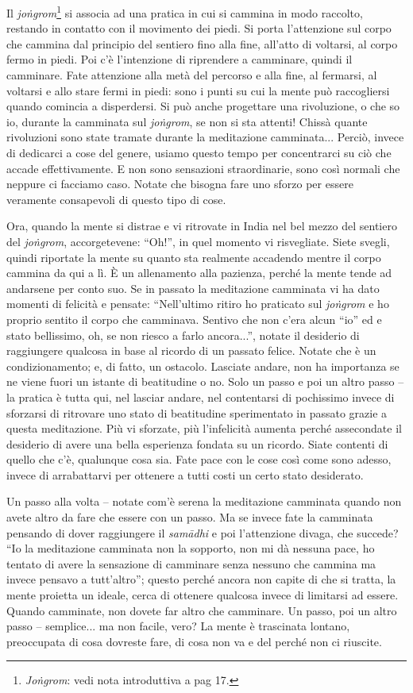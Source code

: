 
Il \textit{joṅgrom}\footnote{\textit{Joṅgrom}: vedi nota introduttiva a pag 17.} si associa ad una pratica in cui si cammina in
modo raccolto, restando in contatto con il movimento dei piedi. Si porta
l'attenzione sul corpo che cammina dal principio del sentiero fino alla
fine, all'atto di voltarsi, al corpo fermo in piedi. Poi c'è
l'intenzione di riprendere a camminare, quindi il camminare. Fate
attenzione alla metà del percorso e alla fine, al fermarsi, al voltarsi
e allo stare fermi in piedi: sono i punti su cui la mente può
raccogliersi quando comincia a disperdersi. Si può anche progettare una
rivoluzione, o che so io, durante la camminata sul \textit{joṅgrom}, se non si
sta attenti! Chissà quante rivoluzioni sono state tramate durante la
meditazione camminata... Perciò, invece di dedicarci a cose del genere,
usiamo questo tempo per concentrarci su ciò che accade effettivamente. E
non sono sensazioni straordinarie, sono così normali che neppure ci
facciamo caso. Notate che bisogna fare uno sforzo per essere veramente
consapevoli di questo tipo di cose.

Ora, quando la mente si distrae e vi ritrovate in India nel bel mezzo
del sentiero del \textit{joṅgrom}, accorgetevene: ``Oh!'', in quel momento vi
risvegliate. Siete svegli, quindi riportate la mente su quanto sta
realmente accadendo mentre il corpo cammina da qui a lì. È un
allenamento alla pazienza, perché la mente tende ad andarsene per conto
suo. Se in passato la meditazione camminata vi ha dato momenti di
felicità e pensate: ``Nell'ultimo ritiro ho praticato sul \textit{joṅgrom} e ho
proprio sentito il corpo che camminava. Sentivo che non c'era alcun ``io''
ed e stato bellissimo, oh, se non riesco a farlo ancora...'', notate il
desiderio di raggiungere qualcosa in base al ricordo di un passato
felice. Notate che è un condizionamento; e, di fatto, un ostacolo.
Lasciate andare, non ha importanza se ne viene fuori un istante di
beatitudine o no. Solo un passo e poi un altro passo – la pratica è
tutta qui, nel lasciar andare, nel contentarsi di pochissimo invece di
sforzarsi di ritrovare uno stato di beatitudine sperimentato in passato
grazie a questa meditazione. Più vi sforzate, più l'infelicità aumenta
perché assecondate il desiderio di avere una bella esperienza fondata su
un ricordo. Siate contenti di quello che c'è, qualunque cosa sia. Fate
pace con le cose così come sono adesso, invece di arrabattarvi per
ottenere a tutti costi un certo stato desiderato.

Un passo alla volta – notate com'è serena la meditazione camminata
quando non avete altro da fare che essere con un passo. Ma se invece
fate la camminata pensando di dover raggiungere il \textit{samādhi} e poi
l'attenzione divaga, che succede? ``Io la meditazione camminata non la
sopporto, non mi dà nessuna pace, ho tentato di avere la sensazione di
camminare senza nessuno che cammina ma invece pensavo a tutt'altro'';
questo perché ancora non capite di che si tratta, la mente proietta un
ideale, cerca di ottenere qualcosa invece di limitarsi ad essere. Quando
camminate, non dovete far altro che camminare. Un passo, poi un altro
passo – semplice... ma non facile, vero? La mente è trascinata lontano,
preoccupata di cosa dovreste fare, di cosa non va e del perché non ci
riuscite.

